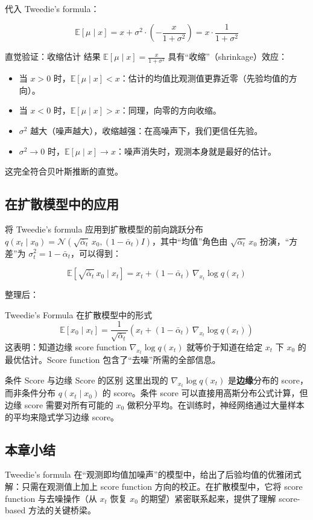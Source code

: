 代入 Tweedie's formula：

$$\mathbb{E}[\mu \mid x] = x + \sigma^2 \cdot \left(-\frac{x}{1+\sigma^2}\right) = x \cdot \frac{1}{1+\sigma^2}$$

\begin{knowledgebox}{直觉验证：收缩估计}
结果 $\mathbb{E}[\mu \mid x] = \frac{x}{1+\sigma^2}$ 具有``收缩''（shrinkage）效应：
\begin{itemize}
    \item 当 $x > 0$ 时，$\mathbb{E}[\mu \mid x] < x$：估计的均值比观测值更靠近零（先验均值的方向）。
    \item 当 $x < 0$ 时，$\mathbb{E}[\mu \mid x] > x$：同理，向零的方向收缩。
    \item $\sigma^2$ 越大（噪声越大），收缩越强：在高噪声下，我们更信任先验。
    \item $\sigma^2 \to 0$ 时，$\mathbb{E}[\mu \mid x] \to x$：噪声消失时，观测本身就是最好的估计。
\end{itemize}
这完全符合贝叶斯推断的直觉。
\end{knowledgebox}

\subsection{在扩散模型中的应用}

将 Tweedie's formula 应用到扩散模型的前向跳跃分布 $q(x_t \mid x_0) = \mathcal{N}(\sqrt{\bar{\alpha}_t}\, x_0, (1-\bar{\alpha}_t)I)$，其中``均值''角色由 $\sqrt{\bar{\alpha}_t}\, x_0$ 扮演，``方差''为 $\sigma_t^2 = 1-\bar{\alpha}_t$，可以得到：

$$\mathbb{E}[\sqrt{\bar{\alpha}_t}\, x_0 \mid x_t] = x_t + (1-\bar{\alpha}_t)\, \nabla_{x_t} \log q(x_t)$$

整理后：

\begin{importantbox}{Tweedie's Formula 在扩散模型中的形式}
$$\mathbb{E}[x_0 \mid x_t] = \frac{1}{\sqrt{\bar{\alpha}_t}} \left(x_t + (1-\bar{\alpha}_t)\, \nabla_{x_t} \log q(x_t)\right)$$
这表明：知道边缘 score function $\nabla_{x_t} \log q(x_t)$ 就等价于知道在给定 $x_t$ 下 $x_0$ 的最优估计。Score function 包含了``去噪''所需的全部信息。
\end{importantbox}

\begin{warningbox}{条件 Score 与边缘 Score 的区别}
这里出现的 $\nabla_{x_t} \log q(x_t)$ 是\textbf{边缘}分布的 score，而非条件分布 $q(x_t \mid x_0)$ 的 score。条件 score 可以直接用高斯分布公式计算，但边缘 score 需要对所有可能的 $x_0$ 做积分平均。在训练时，神经网络通过大量样本的平均来隐式学习边缘 score。
\end{warningbox}

\subsection{本章小结}

Tweedie's formula 在``观测即均值加噪声''的模型中，给出了后验均值的优雅闭式解：只需在观测值上加上 score function 方向的校正。在扩散模型中，它将 score function 与去噪操作（从 $x_t$ 恢复 $x_0$ 的期望）紧密联系起来，提供了理解 score-based 方法的关键桥梁。

